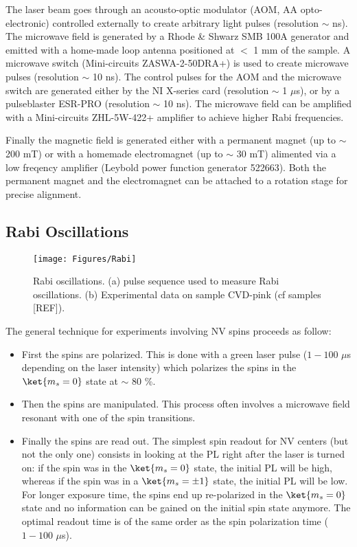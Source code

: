 \documentclass[a4paper,11pt]{report}
\begin{document}
The laser beam goes through an acousto-optic modulator (AOM, AA opto-electronic) controlled externally to create arbitrary light pulses (resolution $\sim$ ns). The microwave field is generated by a Rhode \& Shwarz SMB 100A generator and emitted with a home-made loop antenna positioned at $<$ 1 mm of the sample. A microwave switch (Mini-circuits ZASWA-2-50DRA+) is used to create microwave pulses (resolution $\sim$ 10 ns). The control pulses for the AOM and the microwave switch are generated either by the NI X-series card (resolution $\sim$ 1 $\mu$s), or by a pulseblaster ESR-PRO (resolution $\sim$ 10 ns). The microwave field can be amplified with a Mini-circuits ZHL-5W-422+ amplifier to achieve higher Rabi frequencies. 

Finally the magnetic field is generated either with a permanent magnet (up to $\sim$ 200 mT) or with a homemade electromagnet (up to $\sim$ 30 mT) alimented via a low freqency amplifier (Leybold power function generator 522663). Both the permanent magnet and the electromagnet can be  attached to a rotation stage for precise alignment.
\subsection{Rabi Oscillations}
\begin{figure}[h!]
\centering
\texttt{[image: Figures/Rabi]}
\caption{Rabi oscillations. (a) pulse sequence used to measure Rabi oscillations. (b) Experimental data on sample CVD-pink (cf samples [REF]).}
\label{Rabi}
\end{figure}

The general technique for experiments involving NV spins proceeds as follow: 
\begin{itemize}
\item First the spins are polarized. This is done with a green laser pulse ($1-100$ $\mu$s depending on the laser intensity) which polarizes the spins in the $\ket{m_s=0}$ state at $\sim$ 80 \%.
\item  Then the spins are manipulated. This process often involves a microwave field resonant with one of the spin transitions.
\item Finally the spins are read out. The simplest spin readout for NV centers (but not the only one) consists in looking at the PL right after the laser is turned on: if the spin was in the $\ket{m_s=0}$ state, the initial PL will be high, whereas if the spin was in a $\ket{m_s=\pm 1}$ state, the initial PL will be low. For longer exposure time, the spins end up re-polarized in the $\ket{m_s=0}$ state and no information can be gained on the initial spin state anymore. The optimal readout time is of the same order as the spin polarization time ($1-100$ $\mu$s).
\end{itemize}
\end{document}

